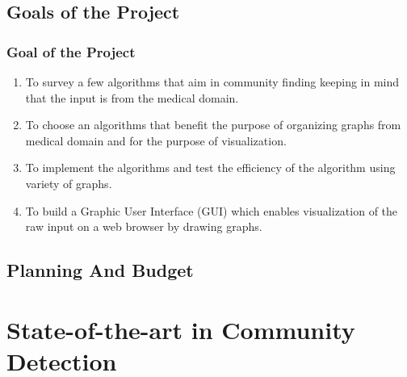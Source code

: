 \documentclass{beamer}
\begin{document}
\subsection*{Goals of the Project}
\frame
{
	\frametitle{Goal of the Project}
	\begin{enumerate}
\item To survey a few algorithms that aim in community finding keeping in mind that the input is from the medical domain. 
\item To choose an algorithms that benefit the purpose of organizing graphs from medical domain and for the purpose of visualization.
\item To implement the algorithms and test the efficiency of the algorithm using variety of graphs.
\item To build a Graphic User Interface (GUI) which enables visualization of the raw input on a web browser by drawing graphs.

\end{enumerate}
}
\subsection*{Planning And Budget}


\section{State-of-the-art in Community Detection}
\end{document}
